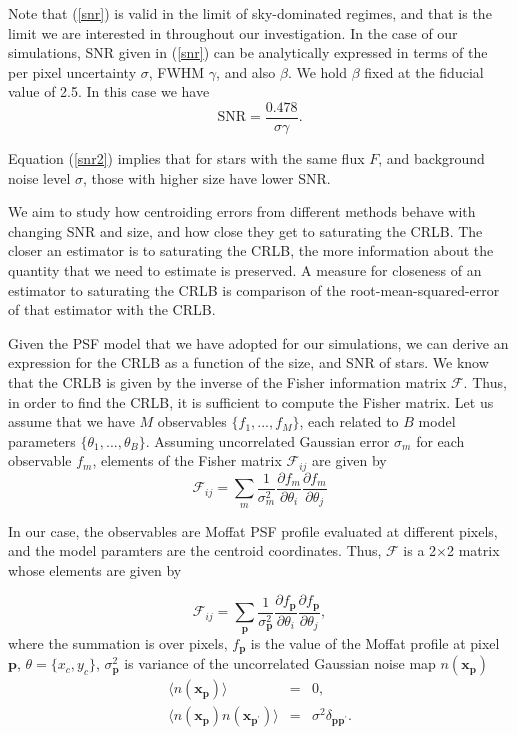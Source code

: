 \documentclass[12pt, preprint]{aastex}
\newcommand{\beq}{\begin{equation}}
\newcommand{\eeq}{\end{equation}}
\begin{document}
Note that (\ref{snr}) is valid in the limit of sky-dominated regimes,
and that is the limit we are interested in throughout our investigation.
 In the case of our simulations, SNR given in (\ref{snr}) can be analytically
 expressed in terms of the per pixel uncertainty
$\sigma$, FWHM $\gamma$, and also $\beta$. We hold $\beta$ fixed at the fiducial value of 2.5.
In this case we have
\beq
\text{SNR} = \frac{0.478}{\sigma \gamma}.
\label{snr2}
\eeq

Equation (\ref{snr2}) implies that for stars with the same flux $F$,
 and background
noise level $\sigma$, those with higher size have lower SNR.

We aim to study how centroiding errors from different methods behave with
changing SNR and size, and how close they get to saturating the CRLB. 
The closer an estimator is to saturating the CRLB, the more information
 about the quantity that we 
need to estimate is preserved. A measure for closeness of an estimator to 
saturating the CRLB is comparison of the root-mean-squared-error of that estimator 
with the CRLB.

Given the PSF model that we have adopted for our simulations, we can derive
 an expression for the CRLB as a function of the size, and SNR of stars.
 We know that the CRLB is given by the inverse of 
the Fisher information matrix $\mathcal{F}$. Thus, in order to find the CRLB,
 it is sufficient to compute the Fisher matrix.
Let us assume that we have $M$ observables $\{f_{1}, ... , f_{M}\}$, each
related to $B$ model parameters $\{\theta_{1} , ... , \theta_{B}\}$. Assuming
uncorrelated Gaussian error $\sigma_{m}$ for each observable $f_{m}$, elements
of the Fisher matrix $\mathcal{F}_{ij}$ are given by
\beq
\mathcal{F}_{ij} = \sum_{m}\frac{1}{\sigma_{m}^{2}}\frac{\partial f_{m}}{\partial \theta_{i}}\frac{\partial f_{m}}{\partial \theta_{j}}
\label{fisher}
\eeq

In our case, the observables are Moffat PSF profile evaluated at different pixels, and  
the model paramters are the centroid coordinates. Thus, $\mathcal{F}$
is a 2$\times$2 matrix whose elements are given by

\beq
  \mathcal{F}_{ij} = \sum_{\mathbf{p}}\frac{1}{\sigma_{\mathbf{p}}^{2}}
                \frac{\partial f_{\mathbf{p}}}{\partial \theta_{i}}\frac{\partial f_{\mathbf{p}}}{\partial \theta_{j}},
\label{fish}
\eeq
where the summation is over pixels, $f_{\mathbf{p}}$ is the value of the Moffat profile at pixel $\mathbf{p}$,
$\theta=\{x_{c},y_{c}\}$, $\sigma_{\mathbf{p}}^{2}$ is variance
of the uncorrelated Gaussian noise map $n(\mathbf{x_{p}})$
\begin{eqnarray}
\langle n(\mathbf{x_{p}}) \rangle &=& 0, \\
\langle n(\mathbf{x_{p}})n(\mathbf{x_{p^{\prime}}}) \rangle &=& \sigma^{2}\delta_{\mathbf{p}\mathbf{p}^{\prime}}. 
\end{eqnarray}
\end{document}
